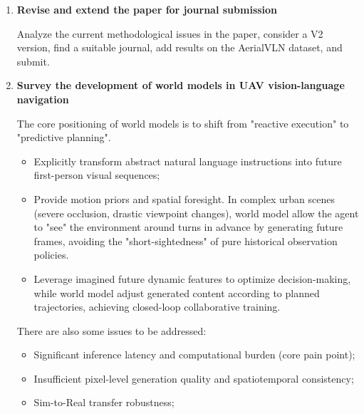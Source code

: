 \documentclass[10pt,letterpaper,oneside]{article}
\begin{document}
\begin{enumerate}\setlength\itemsep{-\parsep}
  \item \Large\textbf{Revise and extend the paper for journal submission} 
  
  \normalsize{
      Analyze the current methodological issues in the paper, consider a V2 version, 
      find a suitable journal, add results on the AerialVLN dataset, and submit.
  }

  \normalsize{
  }

  \item \Large\textbf{Survey the development of world models in UAV vision-language navigation}
  
  \normalsize{
    The core positioning of world models is to shift from "reactive execution" to "predictive planning".
    \begin{itemize}
      \item Explicitly transform abstract natural language instructions into future first-person visual sequences;
      \item Provide motion priors and spatial foresight. In complex urban scenes (severe occlusion, drastic viewpoint changes), 
      world model allow the agent to "see" the environment around turns in advance by generating future frames, 
      avoiding the "short-sightedness" of pure historical observation policies.
      \item Leverage imagined future dynamic features to optimize decision-making, 
      while world model adjust generated content according to planned trajectories, achieving closed-loop collaborative training.
    \end{itemize} 

    There are also some issues to be addressed:
    \begin{itemize}
      \item Significant inference latency and computational burden (core pain point);
      \item Insufficient pixel-level generation quality and spatiotemporal consistency;
      \item Sim-to-Real transfer robustness;
    \end{itemize} 
  }


\end{enumerate}
\end{document}
